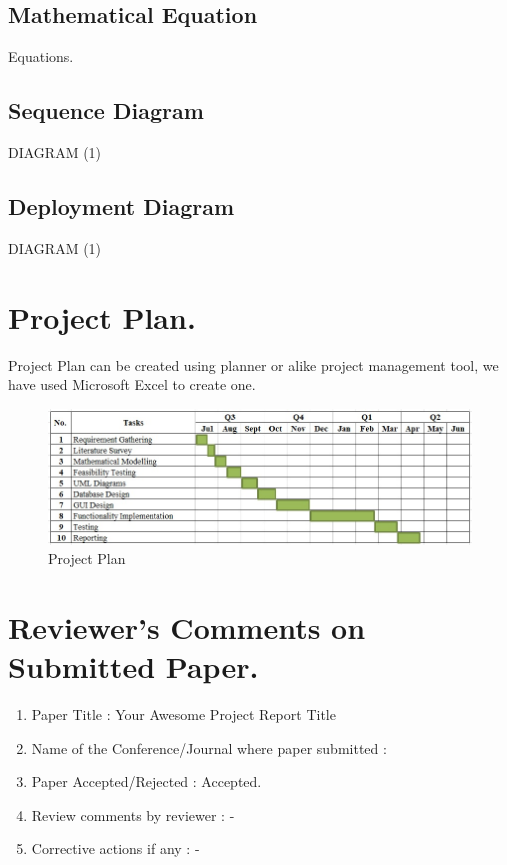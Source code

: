 \documentclass{report} %
\begin{document}
\begin{appendices}
		
		\section{Mathematical Equation}
		Equations.
		\section{Sequence Diagram}
		DIAGRAM (1)
		\section{Deployment Diagram}
		DIAGRAM (1)
		
		\chapter{Project Plan.}
		\pagebreak
		\vspace*{0.5cm}
		Project Plan can be created using planner or alike project management tool, we have used Microsoft Excel to create one.
		
		\begin{figure}[h]
			\centering
			\includegraphics[scale=0.75]{images/project plan.jpg}
			\caption{Project Plan }
		\end{figure}
		
	\chapter{Reviewer's Comments on Submitted Paper.}
	\pagebreak
	\vspace*{0.5cm}
		
		\begin{enumerate}
			\item Paper Title : Your Awesome Project Report Title
			\item Name of the Conference/Journal where paper submitted :
			\item Paper Accepted/Rejected : Accepted.
			\item Review comments by reviewer : -
			\item Corrective actions if any : -
		\end{enumerate}
		

\end{appendices}
\end{document}
